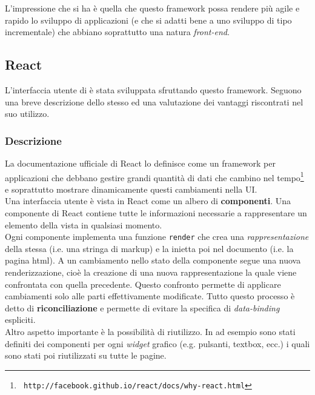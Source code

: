 L'impressione che si ha è quella che questo framework possa rendere più agile e rapido
lo sviluppo di applicazioni (e che si adatti bene a uno sviluppo di tipo incrementale)
che abbiano soprattutto una natura \textit{front-end}.

\subsection{React}

L'interfaccia utente di \fiscoloMobile{} è stata sviluppata sfruttando
questo framework. Seguono una breve descrizione dello stesso ed una valutazione
dei vantaggi riscontrati nel suo utilizzo.

\subsubsection{Descrizione}\label{descrizione-react}
La documentazione ufficiale di React lo definisce come un framework per applicazioni
che debbano gestire grandi quantità di dati che cambino nel tempo\footnote{\texttt{ http://facebook.github.io/react/docs/why-react.html}} e soprattutto
mostrare dinamicamente questi cambiamenti nella UI. \\

Una interfaccia utente è vista in React come un albero di \textbf{componenti}.
Una componente di React contiene tutte le informazioni necessarie a rappresentare
un elemento della vista in qualsiasi momento. \\

Ogni componente implementa una funzione \texttt{render} che crea una
\textit{rappresentazione} della stessa (i.e. una stringa di markup) e la inietta
poi nel documento (i.e. la pagina html). A un cambiamento nello stato della componente
segue una nuova renderizzazione, cioè la creazione di una nuova rappresentazione la quale
viene confrontata con quella precedente. Questo confronto permette di applicare
cambiamenti solo alle parti effettivamente modificate. Tutto questo processo è detto
di \textbf{riconciliazione} e permette di evitare la specifica di
\textit{data-binding} espliciti. \\

Altro aspetto importante è la possibilità di riutilizzo. In \fiscoloMobile{} 
ad esempio sono stati definiti dei componenti per ogni \textit{widget} grafico (e.g.
pulsanti, textbox, ecc.) i quali sono stati poi riutilizzati su tutte le pagine. \\

